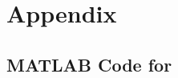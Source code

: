 \renewcommand{\thesubsection}{\thesection.\arabic{subsection}}
\appendix
\section{Appendix}

\subsection{MATLAB Code for }

\begin{center}
	
\end{center}
